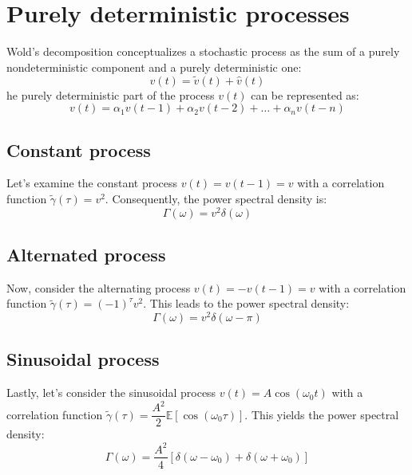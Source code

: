 \section{Purely deterministic processes}

Wold's decomposition conceptualizes a stochastic process as the sum of a purely nondeterministic component and a purely deterministic one:
\[v(t)=\tilde{v}(t)+\widehat{v}(t)\]
he purely deterministic part of the process $v(t)$ can be represented as:
\[v(t) = \alpha_1v(t-1) + \alpha_2v(t-2) + \dots + \alpha_nv(t-n)\]

\subsection{Constant process}
Let's examine the constant process $v(t)=v(t-1)=v$ with a correlation function $\tilde{\gamma}(\tau)=v^2$. 
Consequently, the power spectral density is:
\[\Gamma(\omega)=v^2\delta(\omega)\]

\subsection{Alternated process}
Now, consider the alternating process $v(t)=-v(t-1)=v$ with a correlation function $\tilde{\gamma}(\tau)=(-1)^\tau v^2$. 
This leads to the power spectral density:
\[\Gamma(\omega)=v^2\delta(\omega-\pi)\]

\subsection{Sinusoidal process}
Lastly, let's consider the sinusoidal process $v(t)=A\cos(\omega_0 t)$ with a correlation function $\tilde{\gamma}(\tau)=\dfrac{A^2}{2}\mathbb{E}\left[\cos(\omega_0\tau)\right]$. 
This yields the power spectral density:
\[\Gamma(\omega)=\dfrac{A^2}{4}\left[\delta(\omega-\omega_0)+\delta(\omega+\omega_0)\right]\]